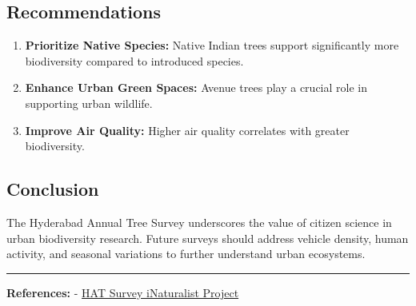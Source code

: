 \documentclass[
]{article}
\providecommand{\tightlist}{%
  \setlength{\itemsep}{0pt}\setlength{\parskip}{0pt}}
\begin{document}
\subsection{Recommendations}\label{recommendations}

\begin{enumerate}
\def\labelenumi{\arabic{enumi}.}
\tightlist
\item
  \textbf{Prioritize Native Species:} Native Indian trees support
  significantly more biodiversity compared to introduced species.
\item
  \textbf{Enhance Urban Green Spaces:} Avenue trees play a crucial role
  in supporting urban wildlife.
\item
  \textbf{Improve Air Quality:} Higher air quality correlates with
  greater biodiversity.
\end{enumerate}

\subsection{Conclusion}\label{conclusion}

The Hyderabad Annual Tree Survey underscores the value of citizen
science in urban biodiversity research. Future surveys should address
vehicle density, human activity, and seasonal variations to further
understand urban ecosystems.

\begin{center}\rule{0.5\linewidth}{0.5pt}\end{center}

\textbf{References:} - \hyperref[]{HAT Survey iNaturalist Project}
\end{document}
